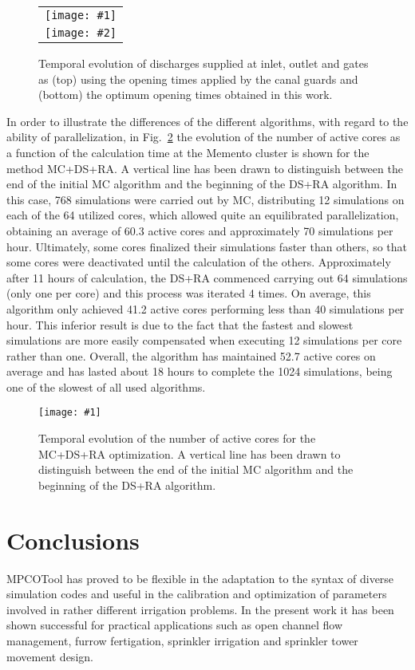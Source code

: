 \documentclass[review,authoryear]{elsarticle}
\newcommand{\PLOT}[3]
{
	\begin{figure}[ht!]
		\centering
		\texttt{[image: \#1]}
		\caption{#2.\label{#3}}
	\end{figure}
}
\newcommand{\FIGII}[4]
{
	\begin{figure}[ht!]
		\centering
		\begin{tabular}{c}
			\texttt{[image: \#1]} \\ \texttt{[image: \#2]}
		\end{tabular}
		\caption{#3.\label{#4}}
	\end{figure}
}
\begin{document}
\FIGII{Violada-contributions.eps}{Violada-optimized-contributions.eps}
{Temporal evolution of discharges supplied at inlet, outlet and gates as (top)
using the opening times applied by the canal guards and (bottom) the optimum
opening times obtained in this work}{FigSwigs}

In order to illustrate the differences of the different algorithms, with regard 
to the ability of parallelization, in Fig.~\ref{FigSwigsLoad} the evolution 
of the number of active cores as a function of the calculation time at the
Memento cluster is shown for the method MC+DS+RA. A vertical line has been
drawn to distinguish between the end of the initial MC algorithm and the
beginning of the DS+RA algorithm. In this case, 768 simulations were carried out by MC, 
distributing 12 simulations on each of the 64 utilized cores, which allowed 
quite an equilibrated parallelization, obtaining an average of 60.3 active
cores and approximately 70 simulations per hour. Ultimately, some cores 
finalized their simulations faster than others, so that some cores were 
deactivated until the calculation of the others. Approximately after 11 hours of
calculation, the DS+RA commenced carrying out 64 simulations (only one per core)
and this process was iterated 4 times. On average, this algorithm only achieved
41.2 active cores performing less than 40 simulations per hour. This inferior 
result is due to the fact that the fastest and slowest simulations are more 
easily compensated when executing 12 simulations per core rather than one. Overall, the
algorithm has maintained 52.7 active cores on average and has lasted about
18 hours to complete the 1024 simulations, being one of the slowest of all
used algorithms. 
\PLOT{load-swigs-mc-ra-768-1-64-4.eps}
{Temporal evolution of the number of active cores for the MC+DS+RA optimization.
A vertical line has been drawn to distinguish between the end of the initial MC algorithm and the
beginning of the DS+RA algorithm}{FigSwigsLoad}

\section{Conclusions}

MPCOTool has proved to be flexible in the adaptation to the syntax of diverse simulation codes and useful in the calibration and optimization of parameters involved in rather different irrigation problems. In the present work it has been shown successful for practical applications such as open channel flow management, furrow fertigation, sprinkler irrigation and sprinkler tower movement design.
\end{document}
